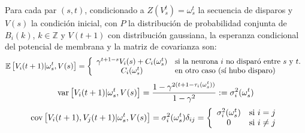 \begin{prop}\label{prop:esperanzareducida}
Para cada par $(s,t)$, condicionado a $Z(V_s^t)=\omega_s^t$ la secuencia de disparos y $V(s)$ la condición inicial, con $P$ la distribución de probabilidad conjunta de $B_i(k)$, $k \in \mathbb{Z}$ y $V(t+1)$ con distribución gaussiana, la esperanza condicional del potencial de membrana y la matriz de covarianza son:
\begin{equation}
    \mathbb{E} \left[V_i(t+1)|\omega_s^t, V(s)\right] = \left\{ \begin{array}{cl}
                        \gamma^{t+1-s} V_i(s) + C_i(\omega_s^t)   & \text{si la neurona $i$ no disparó entre $s$ y $t$.}\\ 
                         C_i(\omega_s^t)    & \text{en otro caso (sí hubo disparo)}
                    \end{array}\right.
    \label{eqn:espCond1}
\end{equation}
\begin{equation}
    \text{var}\left[V_i(t+1)|\omega_s^t, V(s)\right] = \frac{1-\gamma^{2(t+1-\tau_i(\omega_s^t))}}{1-\gamma^2} := \sigma_i^2(\omega_s^t)
    \label{eqn:varianzapot}
\end{equation}
\begin{equation}
    \text{cov}\left[V_i(t+1),V_j(t+1)|\omega_s^t, V(s)\right] = \sigma_i^2(\omega_s^t) \delta_{ij} = \left\{ \begin{array}{cl}
                        \sigma_i^2(\omega_s^t)   & \text{si } i=j\\ 
                         0    & \text{si } i\neq j
                    \end{array}\right.
\end{equation}
\end{prop}

